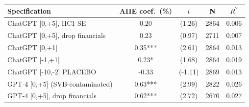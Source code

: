 \begin{tabular}{lcccc}
\toprule
Specification & AIIE coef.\ (\%) & $t$ & N & $R^2$ \\
\midrule
ChatGPT [0,+5], HC1 SE & 0.20 & (1.26) & 2864 & 0.006 \\
ChatGPT [0,+5], drop financials & 0.23 & (0.97) & 2711 & 0.007 \\
ChatGPT [0,+1] & 0.35*** & (2.61) & 2864 & 0.013 \\
ChatGPT [-1,+1] & 0.23* & (1.68) & 2864 & 0.019 \\
ChatGPT [-10,-2] PLACEBO & -0.33 & (-1.11) & 2869 & 0.013 \\
GPT-4 [0,+5] (SVB-contaminated) & 0.63*** & (2.99) & 2822 & 0.026 \\
GPT-4 [0,+5], drop financials & 0.62*** & (2.72) & 2670 & 0.027 \\
\bottomrule
\end{tabular}
